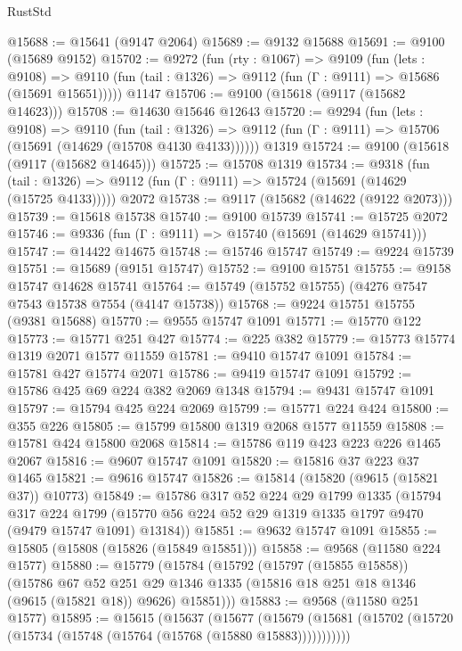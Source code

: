 \begin{lexlean}{RustStd}
\begin{coremodule}
@15688 := @15641 (@9147 @2064)
@15689 := @9132 @15688
@15691 := @9100 (@15689 @9152)
@15702 := @9272
    (fun (rty : @1067) =>
    @9109
      (fun (lets : @9108) =>
      @9110 (fun (tail : @1326) => @9112 (fun (Γ : @9111) => @15686 (@15691 @15651)))))
    @1147
@15706 := @9100 (@15618 (@9117 (@15682 @14623)))
@15708 := @14630 @15646 @12643
@15720 := @9294
    (fun (lets : @9108) =>
    @9110
      (fun (tail : @1326) =>
      @9112 (fun (Γ : @9111) => @15706 (@15691 (@14629 (@15708 @4130 @4133))))))
    @1319
@15724 := @9100 (@15618 (@9117 (@15682 @14645)))
@15725 := @15708 @1319
@15734 := @9318
    (fun (tail : @1326) => @9112 (fun (Γ : @9111) => @15724 (@15691 (@14629 (@15725 @4133)))))
    @2072
@15738 := @9117 (@15682 (@14622 (@9122 @2073)))
@15739 := @15618 @15738
@15740 := @9100 @15739
@15741 := @15725 @2072
@15746 := @9336 (fun (Γ : @9111) => @15740 (@15691 (@14629 @15741)))
@15747 := @14422 @14675
@15748 := @15746 @15747
@15749 := @9224 @15739
@15751 := @15689 (@9151 @15747)
@15752 := @9100 @15751
@15755 := @9158 @15747 @14628 @15741
@15764 := @15749 (@15752 @15755) (@4276 @7547 @7543 @15738 @7554 (@4147 @15738))
@15768 := @9224 @15751 @15755 (@9381 @15688)
@15770 := @9555 @15747 @1091
@15771 := @15770 @122
@15773 := @15771 @251 @427
@15774 := @225 @382
@15779 := @15773 @15774 @1319 @2071 @1577 @11559
@15781 := @9410 @15747 @1091
@15784 := @15781 @427 @15774 @2071
@15786 := @9419 @15747 @1091
@15792 := @15786 @425 @69 @224 @382 @2069 @1348
@15794 := @9431 @15747 @1091
@15797 := @15794 @425 @224 @2069
@15799 := @15771 @224 @424
@15800 := @355 @226
@15805 := @15799 @15800 @1319 @2068 @1577 @11559
@15808 := @15781 @424 @15800 @2068
@15814 := @15786 @119 @423 @223 @226 @1465 @2067
@15816 := @9607 @15747 @1091
@15820 := @15816 @37 @223 @37 @1465
@15821 := @9616 @15747
@15826 := @15814 (@15820 (@9615 (@15821 @37)) @10773)
@15849 := @15786
    @317
    @52
    @224
    @29
    @1799
    @1335
    (@15794
      @317
      @224
      @1799
      (@15770 @56 @224 @52 @29 @1319 @1335 @1797 @9470 (@9479 @15747 @1091) @13184))
@15851 := @9632 @15747 @1091
@15855 := @15805 (@15808 (@15826 (@15849 @15851)))
@15858 := @9568 (@11580 @224 @1577)
@15880 := @15779
    (@15784
      (@15792
        (@15797 (@15855 @15858))
        (@15786
          @67
          @52
          @251
          @29
          @1346
          @1335
          (@15816 @18 @251 @18 @1346 (@9615 (@15821 @18)) @9626)
          @15851)))
@15883 := @9568 (@11580 @251 @1577)
@15895 := @15615
    (@15637
      (@15677
        (@15679 (@15681 (@15702 (@15720 (@15734 (@15748 (@15764 (@15768 (@15880 @15883)))))))))))

\end{coremodule}
\end{lexlean}
